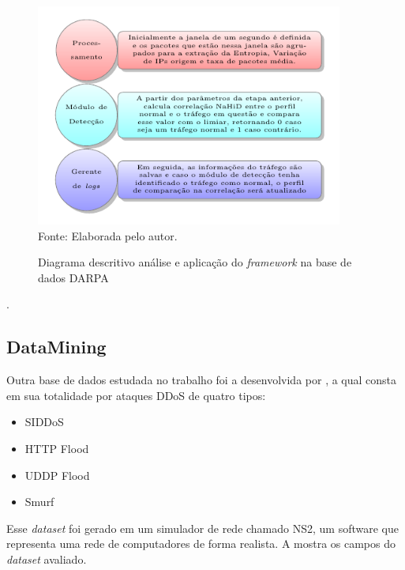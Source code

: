  \begin{figure}[!ht]
 	\centering
 	\caption{Diagrama descritivo análise e aplicação do \textit{framework} na base de dados DARPA  }
 	\includegraphics[width=0.9\textwidth]{figs/analiseDarpa.pdf}\\
 	{Fonte: Elaborada pelo autor.}
 	\label{fig:analiseDarpa}
 \end{figure}

.
\subsection{DataMining}
Outra base de dados estudada no trabalho foi a desenvolvida por \cite{DataMining}, a qual consta em sua totalidade por ataques DDoS de quatro tipos:
\begin{itemize}
	\item SIDDoS
	\item HTTP Flood
	\item UDDP Flood
	\item Smurf
\end{itemize}
Esse \textit{dataset} foi gerado em um simulador de rede chamado NS2, um software que representa uma rede de computadores de forma realista. 
A  mostra os campos do \textit{dataset} avaliado. 

